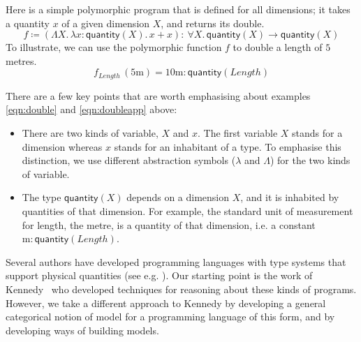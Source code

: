 \documentclass[a4paper,UKenglish]{lipics}
\newcommand{\msf}[1]{\mathsf{#1}} %
\newcommand{\qnt}{\msf{quantity}}
\newcommand{\lengthDim}{\mathit{Length}}
\newcommand{\Dvar}{X}
\begin{document}
Here is a simple polymorphic program that is defined for all dimensions; it takes a quantity $x$ of a given dimension $X$, and returns its double.
\begin{equation}
f\coloneqq (\Lambda X.\,\lambda x:\qnt(X).\,x+x)
:\ \forall X.\,\qnt(X)\to \qnt(X)
\label{eqn:double}
\end{equation}
To illustrate, we can use the polymorphic function $f$ to double a length of $5$ metres.
\begin{equation}
f_\lengthDim\,(5\mathrm{m})=
10\mathrm{m}:\qnt(\lengthDim)
\label{eqn:doubleapp}
\end{equation}

\noindent There are a few key points that are worth emphasising about examples \eqref{eqn:double} and \eqref{eqn:doubleapp} above:
\begin{itemize}
\item There are two kinds of variable, $\Dvar$ and $x$. The first variable $\Dvar$ stands for a dimension whereas $x$ stands for an inhabitant of a type. To emphasise this distinction, we use different abstraction symbols ($\lambda$ and $\Lambda$) for the two kinds of variable.
\item The type $\qnt(\Dvar)$ depends on a dimension $\Dvar$, and it is inhabited by quantities of that dimension. For example, the standard unit of measurement for length, the metre, is a quantity of that dimension, i.e. a constant $\mathrm m:\qnt(\lengthDim)$.
\end{itemize}

Several authors have developed programming languages with type systems that support physical quantities (see e.g. \cite{erwig2002adding, wand1991automatic, house1983proposal, manner1986strong}). Our starting point is the work of Kennedy~\cite{Kennedy:1997:RPU:263699.263761} who developed techniques for reasoning about these kinds of programs. However, we take a different approach to Kennedy by developing a general categorical notion of model for a programming language of this form, and by developing ways of building models.
\end{document}
